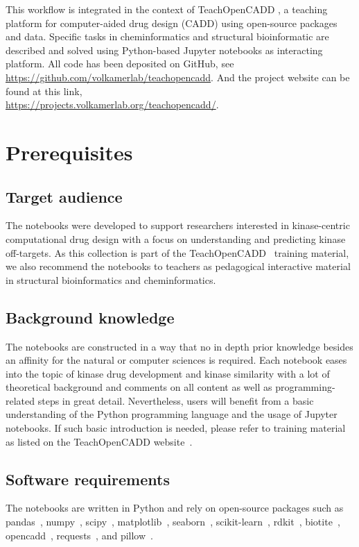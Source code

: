 \documentclass[9pt,training]{livecoms}
\begin{document}
This workflow is integrated in the context of TeachOpenCADD \cite{Sydow_2019_JCheminform, sydow_2022_nar}, a teaching platform for computer-aided drug design (CADD) using open-source packages and data. Specific tasks in cheminformatics and structural bioinformatic are described and solved using Python-based Jupyter notebooks \cite{Kluyver_2016_Jupyter} as interacting platform. All code has been deposited on GitHub, see
\\
\href{https://github.com/volkamerlab/teachopencadd}{https://github.com/volkamerlab/teachopencadd}. And the project website can be found at this link,
\\
\href{https://projects.volkamerlab.org/teachopencadd/}{https://projects.volkamerlab.org/teachopencadd/}. 
\section{Prerequisites}
\subsection{Target audience}
The notebooks were developed to support researchers interested in kinase-centric computational drug design with a focus on understanding and predicting kinase off-targets. 
As this collection is part of the TeachOpenCADD~\cite{Sydow_2019_JCheminform, sydow_2022_nar} training material, we also recommend the notebooks to teachers as pedagogical interactive material in structural bioinformatics and cheminformatics.

\subsection{Background knowledge}
The notebooks are constructed in a way that no in depth prior knowledge besides an affinity for the natural or computer sciences is required. Each notebook eases into the topic of kinase drug development and kinase similarity with a lot of theoretical background and comments on all content as well as programming-related steps in great detail. Nevertheless, users will benefit from a basic understanding of the Python programming language and the usage of Jupyter notebooks. If such basic introduction is needed, please refer to training material as listed on the TeachOpenCADD website~\cite{toc_python_2022}.

\subsection{Software requirements}
The notebooks are written in Python and rely on open-source packages such as pandas~\cite{pandas_2020}, numpy~\cite{harris_2020_numpy}, scipy~\cite{Virtanen_2020_NMeth}, matplotlib~\cite{Hunter_2007_IEEE}, seaborn~\cite{Waskom_2021_seaborn}, scikit-learn~\cite{Pedregosa_2011_JMLR}, rdkit~\cite{RDKit_2022}, biotite~\cite{Kunzmann_2018_biotite}, opencadd~\cite{Sydow_2022_JOSS}, requests~\cite{requests_2022}, and pillow~\cite{pillow_2022}.
\end{document}
